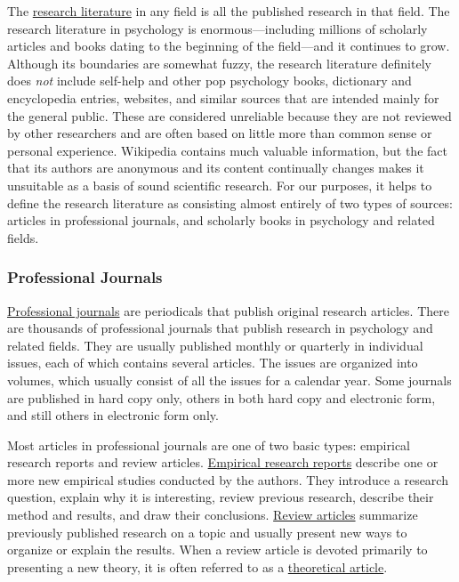 \documentclass[
]{krantz}
\begin{document}
The \protect\hyperlink{research-literature}{research literature} in any field is all the published research in that field. The research literature in psychology is enormous---including millions of scholarly articles and books dating to the beginning of the field---and it continues to grow. Although its boundaries are somewhat fuzzy, the research literature definitely does \emph{not} include self-help and other pop psychology books, dictionary and encyclopedia entries, websites, and similar sources that are intended mainly for the general public. These are considered unreliable because they are not reviewed by other researchers and are often based on little more than common sense or personal experience. Wikipedia contains much valuable information, but the fact that its authors are anonymous and its content continually changes makes it unsuitable as a basis of sound scientific research. For our purposes, it helps to define the research literature as consisting almost entirely of two types of sources: articles in professional journals, and scholarly books in psychology and related fields.

\hypertarget{professional-journals}{%
\subsubsection*{Professional Journals}\label{professional-journals}}


\protect\hyperlink{professional-journal}{Professional journals} are periodicals that publish original research articles. There are thousands of professional journals that publish research in psychology and related fields. They are usually published monthly or quarterly in individual issues, each of which contains several articles. The issues are organized into volumes, which usually consist of all the issues for a calendar year. Some journals are published in hard copy only, others in both hard copy and electronic form, and still others in electronic form only.

Most articles in professional journals are one of two basic types: empirical research reports and review articles. \protect\hyperlink{empirical-research-report}{Empirical research reports} describe one or more new empirical studies conducted by the authors. They introduce a research question, explain why it is interesting, review previous research, describe their method and results, and draw their conclusions. \protect\hyperlink{review-article}{Review articles} summarize previously published research on a topic and usually present new ways to organize or explain the results. When a review article is devoted primarily to presenting a new theory, it is often referred to as a \protect\hyperlink{theoretical-article-1}{theoretical article}.
\end{document}
